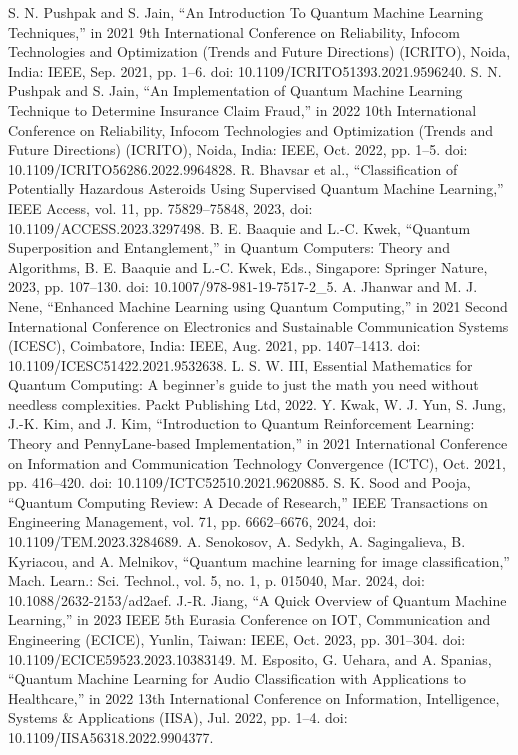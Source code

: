 \documentclass[conference]{IEEEtran}
\begin{document}
\begin{thebibliography}{00}
 S. N. Pushpak and S. Jain, “An Introduction To Quantum Machine Learning Techniques,” in 2021 9th International Conference on Reliability, Infocom Technologies and Optimization (Trends and Future Directions) (ICRITO), Noida, India: IEEE, Sep. 2021, pp. 1–6. doi: 10.1109/ICRITO51393.2021.9596240.
 S. N. Pushpak and S. Jain, “An Implementation of Quantum Machine Learning Technique to Determine Insurance Claim Fraud,” in 2022 10th International Conference on Reliability, Infocom Technologies and Optimization (Trends and Future Directions) (ICRITO), Noida, India: IEEE, Oct. 2022, pp. 1–5. doi: 10.1109/ICRITO56286.2022.9964828.
 R. Bhavsar et al., “Classification of Potentially Hazardous Asteroids Using Supervised Quantum Machine Learning,” IEEE Access, vol. 11, pp. 75829–75848, 2023, doi: 10.1109/ACCESS.2023.3297498.
 B. E. Baaquie and L.-C. Kwek, “Quantum Superposition and Entanglement,” in Quantum Computers: Theory and Algorithms, B. E. Baaquie and L.-C. Kwek, Eds., Singapore: Springer Nature, 2023, pp. 107–130. doi: 10.1007/978-981-19-7517-2\_5.
 A. Jhanwar and M. J. Nene, “Enhanced Machine Learning using Quantum Computing,” in 2021 Second International Conference on Electronics and Sustainable Communication Systems (ICESC), Coimbatore, India: IEEE, Aug. 2021, pp. 1407–1413. doi: 10.1109/ICESC51422.2021.9532638.
 L. S. W. III, Essential Mathematics for Quantum Computing: A beginner’s guide to just the math you need without needless complexities. Packt Publishing Ltd, 2022.
 Y. Kwak, W. J. Yun, S. Jung, J.-K. Kim, and J. Kim, “Introduction to Quantum Reinforcement Learning: Theory and PennyLane-based Implementation,” in 2021 International Conference on Information and Communication Technology Convergence (ICTC), Oct. 2021, pp. 416–420. doi: 10.1109/ICTC52510.2021.9620885.
 S. K. Sood and Pooja, “Quantum Computing Review: A Decade of Research,” IEEE Transactions on Engineering Management, vol. 71, pp. 6662–6676, 2024, doi: 10.1109/TEM.2023.3284689.
 A. Senokosov, A. Sedykh, A. Sagingalieva, B. Kyriacou, and A. Melnikov, “Quantum machine learning for image classification,” Mach. Learn.: Sci. Technol., vol. 5, no. 1, p. 015040, Mar. 2024, doi: 10.1088/2632-2153/ad2aef.
 J.-R. Jiang, “A Quick Overview of Quantum Machine Learning,” in 2023 IEEE 5th Eurasia Conference on IOT, Communication and Engineering (ECICE), Yunlin, Taiwan: IEEE, Oct. 2023, pp. 301–304. doi: 10.1109/ECICE59523.2023.10383149.
 M. Esposito, G. Uehara, and A. Spanias, “Quantum Machine Learning for Audio Classification with Applications to Healthcare,” in 2022 13th International Conference on Information, Intelligence, Systems \& Applications (IISA), Jul. 2022, pp. 1–4. doi: 10.1109/IISA56318.2022.9904377.

\end{thebibliography}
\end{document}
